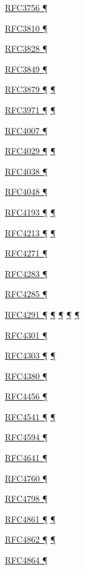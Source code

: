 \documentclass[
]{article}
\begin{document}
\hyperref[layer-2-considerations]{RFC3756 ¶}

\hyperref[address-resolution]{RFC3810 ¶}

\hyperref[transport-protocols]{RFC3828 ¶}

\hyperref[addresses]{RFC3849 ¶}

\hyperref[obsolete-features-in-ipv6]{RFC3879 ¶} \hyperref[addresses]{¶}

\hyperref[security]{RFC3971 ¶} \hyperref[layer-2-considerations]{¶}

\hyperref[addresses]{RFC4007 ¶}

\hyperref[layer-2-functions]{RFC4029 ¶} \hyperref[tunnels]{¶}

\hyperref[addresses]{RFC4038 ¶}

\hyperref[addresses]{RFC4048 ¶}

\hyperref[filtering]{RFC4193 ¶} \hyperref[multihoming]{¶}

\hyperref[dual-stack-scenarios]{RFC4213 ¶} \hyperref[tunnels]{¶}

\hyperref[routing]{RFC4271 ¶}

\hyperref[obsolete-features-in-ipv6]{RFC4283 ¶}

\hyperref[obsolete-features-in-ipv6]{RFC4285 ¶}

\hyperref[obsolete-features-in-ipv6]{RFC4291 ¶}
\hyperref[address-resolution]{¶} \hyperref[addresses]{¶}
\hyperref[filtering]{¶} \hyperref[markdown-usage]{¶}

\hyperref[security]{RFC4301 ¶}

\hyperref[extension-headers-and-options]{RFC4303 ¶}
\hyperref[packet-format]{¶}

\hyperref[obsolete-techniques]{RFC4380 ¶}

\hyperref[routing]{RFC4456 ¶}

\hyperref[address-resolution]{RFC4541 ¶}
\hyperref[layer-2-considerations]{¶}

\hyperref[traffic-class-and-flow-label]{RFC4594 ¶}

\hyperref[filtering]{RFC4641 ¶}

\hyperref[routing]{RFC4760 ¶}

\hyperref[tunnels]{RFC4798 ¶}

\hyperref[address-resolution]{RFC4861 ¶}
\hyperref[auto-configuration]{¶}

\hyperref[auto-configuration]{RFC4862 ¶}
\hyperref[address-and-prefix-management]{¶}

\hyperref[topology-obfuscation]{RFC4864 ¶}
\end{document}
